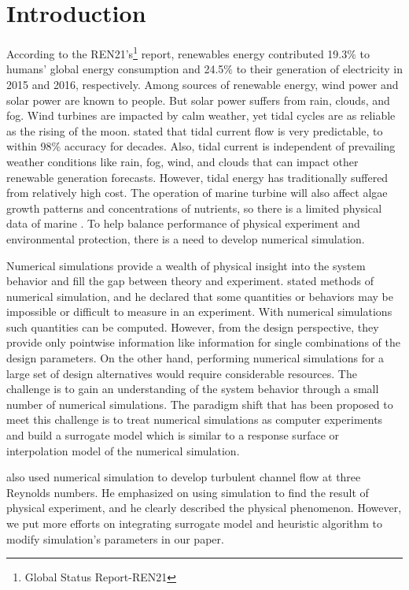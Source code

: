 \chapter{Introduction}

According to the REN21's\footnote{Global Status Report-REN21} report, renewables energy contributed 19.3${\%}$ to humans' global energy consumption and 24.5${\%}$ to their generation of electricity in 2015 and 2016, respectively. Among sources of renewable energy, wind power and solar power are known to people. But solar power suffers from rain, clouds, and fog. Wind turbines are impacted by calm weather, yet tidal cycles are as reliable as the rising of the moon. \cite{elghali2007marine} stated that tidal current flow is very predictable, to within 98${\%}$ accuracy for decades. Also, tidal current is independent of prevailing weather conditions like rain, fog, wind, and clouds that can impact other renewable generation forecasts. However, tidal energy has traditionally suffered from relatively high cost. The operation of marine turbine will also affect algae growth patterns and concentrations of nutrients, so there is a limited physical data of marine \cite{james2017simulating}. To help balance performance of physical experiment and environmental protection, there is a need to develop numerical simulation.

Numerical simulations provide a wealth of physical insight into the system behavior and fill the gap between theory and experiment. \cite{heermann1990computer} stated methods of numerical simulation, and he declared that some quantities or behaviors may be impossible or difficult to measure in an experiment. With numerical simulations such quantities can be computed. However, from the design perspective, they provide only pointwise information like information for single combinations of the design parameters. On the other hand, performing numerical simulations for a large set of design alternatives would require considerable resources. The challenge is to gain an understanding of the system behavior through a small number of numerical simulations. The paradigm shift that has been proposed to meet this challenge is to treat numerical simulations as computer experiments and build a surrogate model which is similar to a response surface or interpolation model of the numerical simulation. 

\cite{moser1999direct} also used numerical simulation to develop turbulent channel flow at three Reynolds numbers. He emphasized on using simulation to find the result of physical experiment, and he clearly described the physical phenomenon. However, we put more efforts on integrating surrogate model and heuristic algorithm to modify simulation's parameters in our paper.
 
